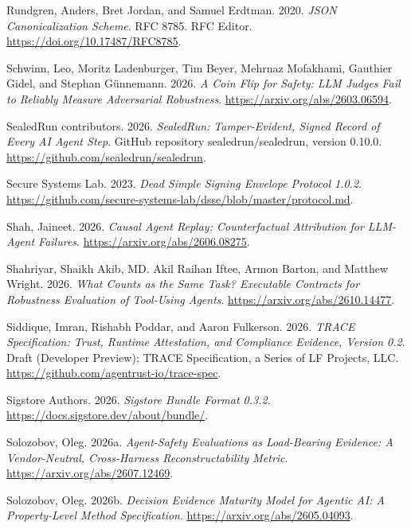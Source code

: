 \documentclass[
  american,
  10pt,
  a4paper,
]{article}
\newlength{\cslhangindent}
\newenvironment{CSLReferences}[2] %
 {\begin{list}{}{%
  \setlength{\itemindent}{0pt}
  \setlength{\leftmargin}{0pt}
  \setlength{\parsep}{0pt}
  \ifodd #1
   \setlength{\leftmargin}{\cslhangindent}
   \setlength{\itemindent}{-1\cslhangindent}
  \fi
  \setlength{\itemsep}{#2\baselineskip}}}
 {\end{list}}
\begin{document}
\begin{CSLReferences}{1}{1}
Rundgren, Anders, Bret Jordan, and Samuel Erdtman. 2020. \emph{JSON
Canonicalization Scheme}. RFC 8785. RFC Editor.
\url{https://doi.org/10.17487/RFC8785}.

Schwinn, Leo, Moritz Ladenburger, Tim Beyer, Mehrnaz Mofakhami, Gauthier
Gidel, and Stephan Günnemann. 2026. \emph{A Coin Flip for Safety: {LLM}
Judges Fail to Reliably Measure Adversarial Robustness}.
\url{https://arxiv.org/abs/2603.06594}.

SealedRun contributors. 2026. \emph{{SealedRun}: Tamper-Evident, Signed
Record of Every {AI} Agent Step}. GitHub repository sealedrun/sealedrun,
version 0.10.0. \url{https://github.com/sealedrun/sealedrun}.

Secure Systems Lab. 2023. \emph{Dead Simple Signing Envelope Protocol
1.0.2}.
\url{https://github.com/secure-systems-lab/dsse/blob/master/protocol.md}.

Shah, Jaineet. 2026. \emph{Causal Agent Replay: Counterfactual
Attribution for {LLM}-Agent Failures}.
\url{https://arxiv.org/abs/2606.08275}.

Shahriyar, Shaikh Akib, MD. Akil Raihan Iftee, Armon Barton, and Matthew
Wright. 2026. \emph{What Counts as the Same Task? Executable Contracts
for Robustness Evaluation of Tool-Using Agents}.
\url{https://arxiv.org/abs/2610.14477}.

Siddique, Imran, Rishabh Poddar, and Aaron Fulkerson. 2026.
\emph{{TRACE} Specification: Trust, Runtime Attestation, and Compliance
Evidence, Version 0.2}. Draft (Developer Preview); TRACE Specification,
a Series of LF Projects, LLC.
\url{https://github.com/agentrust-io/trace-spec}.

Sigstore Authors. 2026. \emph{Sigstore Bundle Format 0.3.2}.
\url{https://docs.sigstore.dev/about/bundle/}.

Solozobov, Oleg. 2026a. \emph{Agent-Safety Evaluations as Load-Bearing
Evidence: A Vendor-Neutral, Cross-Harness Reconstructability Metric}.
\url{https://arxiv.org/abs/2607.12469}.

Solozobov, Oleg. 2026b. \emph{Decision Evidence Maturity Model for
Agentic {AI}: A Property-Level Method Specification}.
\url{https://arxiv.org/abs/2605.04093}.


\end{CSLReferences}
\end{document}
